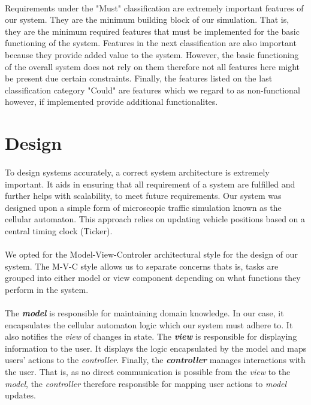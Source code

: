 \documentclass[a4paper,11pt,titlepage]{article}
\begin{document}
\paragraph{}
Requirements under the "Must" classification are extremely important features of our system. They are the minimum building block of our simulation. That is, they are the minimum required features that must be implemented for the basic functioning of the system. Features in the next classification are also important because they provide added value to the system. However, the basic functioning of the overall system does not rely on them therefore not all features here might be present due certain constraints. Finally, the features listed on the last classification category "Could" are features which we regard to as non-functional however, if implemented provide additional functionalites.
\section{Design}
\paragraph{}
To design systems accurately, a correct system architecture is extremely important. It aids in ensuring that all requirement of a system are fulfilled and further helps with scalability, to meet future requirements.
Our system was designed upon a simple form of microscopic traffic simulation known as the cellular automaton. This approach relies on updating vehicle positions based on a central timing clock (Ticker).
\paragraph{}
We opted for the Model-View-Controler architectural style for the design of our system. The M-V-C style allows us to separate concerns thats is, tasks are grouped into either model or view component depending on what functions they perform in the system.
\paragraph{}
The \textbf{\textit{model}} is responsible for maintaining domain knowledge. In our case, it encapsulates the cellular automaton logic which our system must adhere to. It also notifies the \textit{view} of changes in state.
The \textbf{\textit{view}} is responsible for displaying information to the user. It displays the logic encapsulated by the model and maps users' actions to the \textit{controller}. Finally, the \textbf{\textit{controller}} manages interactions with the user. That is, as no direct communication is possible from the \textit{view} to the \textit{model}, the \textit{controller} therefore responsible for mapping user actions to \textit{model} updates.
\end{document}
